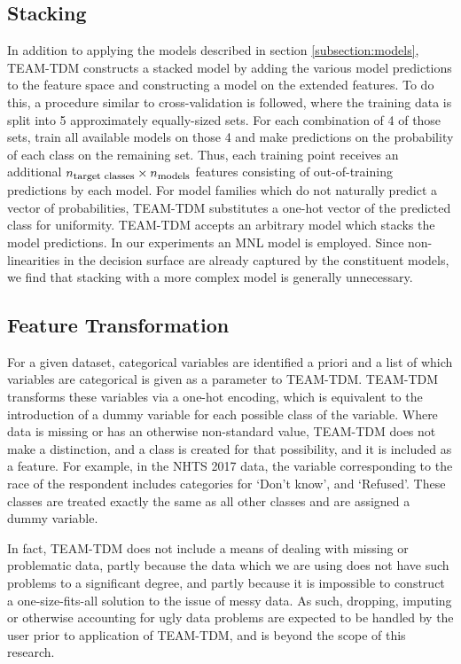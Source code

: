 \documentclass[numbered]{trbunofficial}
\begin{document}
\subsection{Stacking} \label{subsection:stacking}

In addition to applying the models described in section \ref{subsection:models}, TEAM-TDM constructs a stacked model by adding the various model predictions to the feature space and constructing a model on the extended features.
 To do this, a procedure similar to cross-validation is followed, where the training data is split into 5 approximately equally-sized sets.
 For each combination of 4 of those sets, train all available models on those 4 and make predictions on the probability of each class on the remaining set.
 Thus, each training point receives an additional $n_{\mbox{\footnotesize target classes}} \times n_{\mbox{\footnotesize models}}$ features consisting of out-of-training predictions by each model.
 For model families which do not naturally predict a vector of probabilities, TEAM-TDM substitutes a one-hot vector of the predicted class for uniformity.
 TEAM-TDM accepts an arbitrary model which stacks the model predictions.
 In our experiments an MNL model is employed.
 Since non-linearities in the decision surface are already captured by the constituent models, we find that stacking with a more complex model is generally unnecessary.

\subsection{Feature Transformation} \label{subsection:transformation}

For a given dataset, categorical variables are identified a priori and a list of which variables are categorical is given as a parameter to TEAM-TDM.
 TEAM-TDM transforms these variables via a one-hot encoding, which is equivalent to the introduction of a dummy variable for each possible class of the variable.
 Where data is missing or has an otherwise non-standard value, TEAM-TDM does not make a distinction, and a class is created for that possibility, and it is included as a feature.
 For example, in the NHTS 2017 data, the variable corresponding to the race of the respondent includes categories for `Don't know', and `Refused'.
 These classes are treated exactly the same as all other classes and are assigned a dummy variable.
 
In fact, TEAM-TDM does not include a means of dealing with missing or problematic data, partly because the data which we are using does not have such problems to a significant degree, and partly because it is impossible to construct a one-size-fits-all solution to the issue of messy data.
 As such, dropping, imputing or otherwise accounting for ugly data problems are expected to be handled by the user prior to application of TEAM-TDM, and is beyond the scope of this research.
\end{document}
